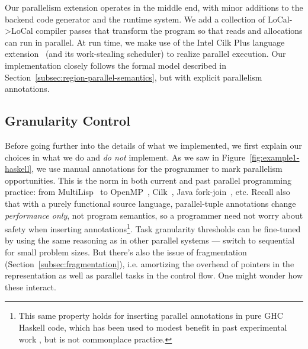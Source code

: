 \documentclass[acmsmall,acmthm=false,nonacm]{acmart}
\theoremstyle{straighttext0}
\theoremstyle{straighttext}
\newcommand{\Secref}[1]{Section~\ref{#1}}
\newcommand{\Figref}[1]{Figure~\ref{#1}}
\begin{document}
{Our parallelism extension operates in the middle end,
with minor additions to the backend code generator and the runtime system.
%
We add a collection of LoCal->LoCal compiler passes that transform the program
so that reads and allocations can run in parallel.
%
At run time, we make use of the Intel Cilk Plus language extension~\cite{blumofe1996cilk}
(and its work-stealing scheduler) to realize parallel execution.
Our implementation closely follows the formal model described in \Secref{subsec:region-parallel-semantics},
but with explicit parallelism annotations.
%



\subsection{Granularity Control}
\label{subsec:granularity}

Before going further into the details of what we implemented, we first
explain our choices in what we do and {\em do not} implement.
As we saw in \Figref{fig:example1-haskell}, we use manual annotations
for the programmer to mark parallelism opportunities.  This is the
norm in both current and past parallel programming practice: from
MultiLisp~\cite{multilisp} to OpenMP~\cite{openmp}, Cilk~\cite{blumofe1996cilk},
Java fork-join~\cite{lea2000java}, etc.
%
Recall also that with a purely functional source language,
parallel-tuple annotations change {\em performance only}, not program
semantics, so a programmer need not worry about safety when inserting
annotations\footnote{This same property holds for inserting parallel
  annotations in pure GHC Haskell code, which has been used to modest
  benefit in past experimental work \cite{ghc-insert-parallelism}, but
  is not commonplace practice.}.
%
Task granularity thresholds can be fine-tuned by using the same reasoning
as in other parallel systems --- switch to sequential for small
problem sizes.
%
But there's also the issue of fragmentation
(\Secref{subsec:fragmentation}), i.e. amortizing the overhead of
pointers in the representation as well as parallel tasks in the
control flow. One might wonder how these interact.

}
\end{document}

